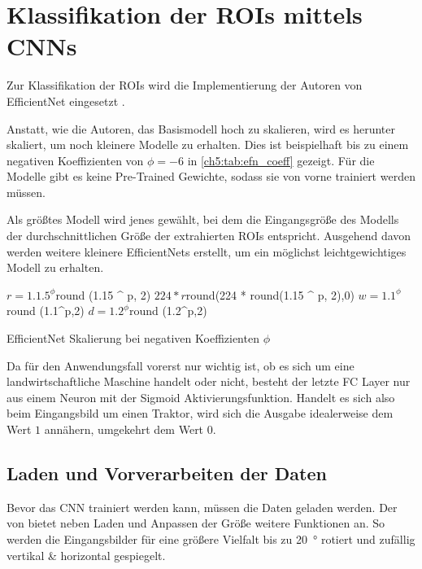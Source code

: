 \section{Klassifikation der ROIs mittels CNNs} \label{ch5:cnn}
Zur Klassifikation der \acp{ROI} wird die Implementierung der Autoren von EfficientNet eingesetzt \cite{yakubovskiy_qubvel/efficientnet_2019}.

Anstatt, wie die Autoren, das Basismodell  hoch zu skalieren, wird es herunter skaliert, um noch kleinere Modelle zu erhalten.
Dies ist beispielhaft bis zu einem negativen Koeffizienten von $\phi=-6$ in \autoref{ch5:tab:efn_coeff} gezeigt.
Für die  Modelle gibt es keine Pre-Trained Gewichte, sodass sie von vorne trainiert werden müssen.

Als größtes Modell wird jenes gewählt, bei dem die Eingangsgröße des Modells der durchschnittlichen Größe der extrahierten \acp{ROI} entspricht.
Ausgehend davon werden weitere kleinere EfficientNets erstellt, um ein möglichst leichtgewichtiges Modell zu erhalten.

\begin{table}[ht]
    \tcsethrule {}{\hline \hline}{\hline}
                {$r=1.1.5^\phi$}{round (1.15 ^ p, 2)}
                { $224*r$}{round(224 * round(1.15 ^ p, 2),0)}
                { $w=1.1^\phi$}{round (1.1^p,2)}
                { $d=1.2^\phi$}{round (1.2^p,2)}
    \caption{EfficientNet Skalierung bei negativen Koeffizienten $\phi$}
    \label{ch5:tab:efn_coeff}
\end{table}

\bigskip
Da für den Anwendungsfall vorerst nur wichtig ist, ob es sich um eine landwirtschaftliche Maschine handelt oder nicht, besteht der letzte \ac{FC} Layer nur aus einem Neuron mit der Sigmoid Aktivierungsfunktion.
Handelt es sich also beim Eingangsbild um einen Traktor, wird sich die Ausgabe idealerweise dem Wert $1$ annähern, umgekehrt dem Wert $0$.


\subsection*{Laden und Vorverarbeiten der Daten}
Bevor das \ac{CNN} trainiert werden kann, müssen die Daten geladen werden.
Der  von  bietet neben Laden und Anpassen der Größe weitere Funktionen an.
So werden die Eingangsbilder für eine größere Vielfalt bis zu \SI{20}{\degree} rotiert und zufällig vertikal \& horizontal gespiegelt.

